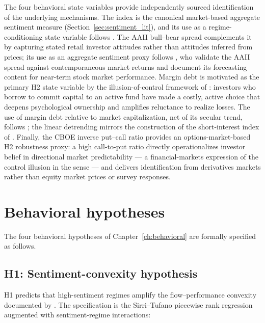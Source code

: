 \documentclass[12pt, oneside]{report}
\begin{document}
\noindent The four behavioral state variables provide independently
sourced identification of the underlying mechanisms. The
\textcite{BakerWurgler2006} index is the canonical market-based aggregate
sentiment measure (Section~\ref{sec:sentiment_lit}), and its use as a
regime-conditioning state variable follows \textcite{StambaughYuYuan2012}.
The AAII bull--bear spread complements it by capturing stated
retail investor attitudes rather than
attitudes inferred from prices; its use as an aggregate sentiment proxy
follows \textcite{BrownCliff2004}, who validate the AAII spread against
contemporaneous market returns and document its forecasting content for
near-term stock market performance. Margin debt is motivated as
the primary H2 state variable by the illusion-of-control framework of
\textcite{Langer1975}: investors who borrow to commit capital to an
active fund have made a costly, active choice that deepens
psychological ownership \parencite{Thaler1980} and amplifies
reluctance to realize losses. The use of margin debt relative to market
capitalization, net of its secular trend, follows
\textcite{DanielKlosPollet2016}; the linear detrending mirrors the
construction of the short-interest index of
\textcite{RapachRinggenbergZhou2016}. Finally, the CBOE inverse put--call ratio
provides an options-market-based H2 robustness proxy: a high
call-to-put ratio directly operationalizes investor belief in
directional market predictability --- a financial-markets expression
of the control illusion in the \textcite{Langer1975} sense --- and
delivers identification from derivatives markets rather than equity
market prices or survey responses.

\section{Behavioral hypotheses}
\label{sec:hypotheses_methodology}

\noindent The four behavioral hypotheses of Chapter~\ref{ch:behavioral}
are formally specified as follows.

\subsection{H1: Sentiment-convexity hypothesis}
\label{sec:H1_method}

\noindent H1 predicts that high-sentiment regimes amplify the
flow--performance convexity documented by \textcite{SirriTufano1998}.
The specification is the Sirri--Tufano piecewise rank regression
augmented with sentiment-regime interactions:
\end{document}

